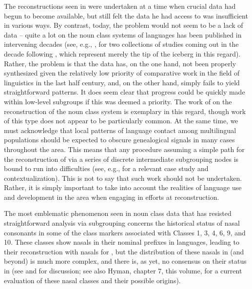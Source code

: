 \documentclass[output=paper ,collection	  ,collectionchapter ,biblatexbackend=biber   ]{langscibook}
\begin{document}
The reconstructions seen in  were undertaken at a time when
crucial data had begun to become available, but  still
felt the data he had access to was insufficient in various ways. By contrast,
today, the problem would not seem to be a lack of data -- quite a lot on the noun
class systems of  languages has been published in intervening
decades (see, e.g., ,  for
two collections of studies coming out in the decade following
, which represent merely the tip of the iceberg in
this regard). Rather, the problem is that the data has, on the one hand, not
been properly synthesized given the relatively low priority of comparative work
in the field of linguistics in the last half century, and, on the other hand,
simply fails to yield straightforward patterns. It does seem clear that progress
could be quickly made within low-level subgroups if this was deemed a priority.
The work of  on the reconstruction of the 
noun class system is exemplary in this regard, though work of this type does not
appear to be particularly common. At the same time, we must acknowledge that
local patterns of language contact among multilingual populations should be
expected to obscure genealogical signals in many cases throughout the  area. This means that any procedure assuming a simple path for the
reconstruction of  via a series of discrete intermediate
subgrouping nodes is bound to run into difficulties (see, e.g.,
 for a relevant case study and
contextualization). This is not to say that such work should not be undertaken.
Rather, it is simply important to take into account the realities of language
use and development in the  area when engaging in efforts at
reconstruction.

The most emblematic phenomenon seen in  noun class data that
has resisted straightforward analysis via subgrouping concerns the historical
status of nasal consonants in some of the class markers associated with Classes
1, 3, 4, 6, 9, and 10. These classes show nasals in their nominal prefixes in
 languages, leading to their reconstruction with nasals for ,
but the distribution of these nasals in  (and
beyond) is much more complex, and there is, as yet, no consensus on their status
in  (see  and  for
discussion; see also Hyman, chapter 7, this volume, for a current evaluation of 
these nasal classes and their possible origins).
\end{document}
